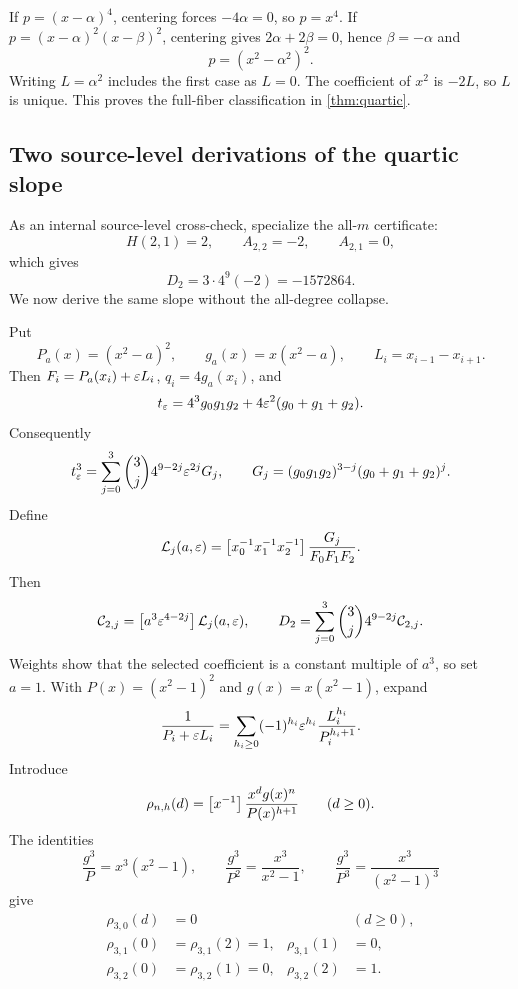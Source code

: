 \documentclass[11pt]{article}
\theoremstyle{definition}
\theoremstyle{remark}
\begin{document}
If \(p=(x-\alpha)^4\), centering forces \(-4\alpha=0\), so
\(p=x^4\).  If
\(p=(x-\alpha)^2(x-\beta)^2\), centering gives
\(2\alpha+2\beta=0\), hence \(\beta=-\alpha\) and
\[
p=(x^2-\alpha^2)^2.
\]
Writing \(L=\alpha^2\) includes the first case as \(L=0\).  The coefficient
of \(x^2\) is \(-2L\), so \(L\) is unique.  This proves the full-fiber
classification in \cref{thm:quartic}.

\subsection{Two source-level derivations of the quartic slope}
\label{subsec:quartic-slope}

As an internal source-level cross-check, specialize the all-\(m\) certificate:
\[
H(2,1)=2,
\qquad
A_{2,2}=-2,
\qquad
A_{2,1}=0,
\]
which gives
\begin{equation}
D_2=3\cdot4^9(-2)=-1572864.
\label{eq:D2-crosscheck}
\end{equation}
We now derive the same slope without the all-degree collapse.

Put
\[
P_a(x)=(x^2-a)^2,
\qquad
g_a(x)=x(x^2-a),
\qquad
L_i=x_{i-1}-x_{i+1}.
\]
Then \(F_i=P_a(x_i)+\varepsilon L_i\), \(q_i=4g_a(x_i)\), and
\[
t_\varepsilon=4^3g_0g_1g_2+4\varepsilon^2(g_0+g_1+g_2).
\]
Consequently
\begin{equation}
t_\varepsilon^3=\sum_{j=0}^3\binom{3}{j}4^{9-2j}\varepsilon^{2j}G_j,
\qquad
G_j=(g_0g_1g_2)^{3-j}(g_0+g_1+g_2)^j.
\label{eq:quartic-t-cube}
\end{equation}
Define
\[
\mathcal{L}_j(a,\varepsilon)=
\left[x_0^{-1}x_1^{-1}x_2^{-1}\right]\frac{G_j}{F_0F_1F_2}.
\]
Then
\begin{equation}
\mathcal{C}_{2,j}=\left[a^3\varepsilon^{4-2j}\right]\mathcal{L}_j(a,\varepsilon),
\qquad
D_2=\sum_{j=0}^3\binom3j4^{9-2j}\mathcal{C}_{2,j}.
\label{eq:quartic-Cj}
\end{equation}
Weights show that the selected coefficient is a constant multiple of
\(a^3\), so set \(a=1\).  With
\(P(x)=(x^2-1)^2\) and \(g(x)=x(x^2-1)\), expand
\begin{equation}
\frac1{P_i+\varepsilon L_i}
=\sum_{h_i\ge0}(-1)^{h_i}\varepsilon^{h_i}
\frac{L_i^{h_i}}{P_i^{h_i+1}}.
\label{eq:quartic-reciprocal}
\end{equation}
Introduce
\[
\rho_{n,h}(d)=
\left[x^{-1}\right]\frac{x^d g(x)^n}{P(x)^{h+1}}
\qquad(d\ge0).
\]
The identities
\[
\frac{g^3}{P}=x^3(x^2-1),
\qquad
\frac{g^3}{P^2}=\frac{x^3}{x^2-1},
\qquad
\frac{g^3}{P^3}=\frac{x^3}{(x^2-1)^3}
\]
give
\begin{align*}
\rho_{3,0}(d)&=0 &&(d\ge0),\\
\rho_{3,1}(0)&=\rho_{3,1}(2)=1,
&\rho_{3,1}(1)&=0,\\
\rho_{3,2}(0)&=\rho_{3,2}(1)=0,
&\rho_{3,2}(2)&=1.
\end{align*}
\end{document}
